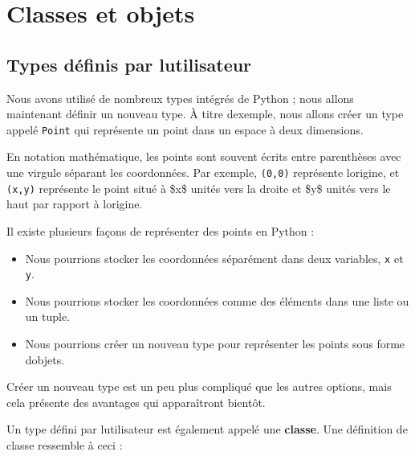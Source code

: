\hypertarget{classes-et-objets}{%
\section{Classes et objets}\label{classes-et-objets}}

\hypertarget{types-duxe9finis-par-lutilisateur}{%
\subsection{Types définis par
l\textquotesingle utilisateur}\label{types-duxe9finis-par-lutilisateur}}

Nous avons utilisé de nombreux types intégrés de Python ; nous allons
maintenant définir un nouveau type. À titre d\textquotesingle exemple,
nous allons créer un type appelé \texttt{Point} qui représente un point
dans un espace à deux dimensions.

En notation mathématique, les points sont souvent écrits entre
parenthèses avec une virgule séparant les coordonnées. Par exemple,
\texttt{(0,0)} représente l\textquotesingle origine, et \texttt{(x,y)}
représente le point situé à \$x\$ unités vers la droite et \$y\$ unités
vers le haut par rapport à l\textquotesingle origine.

Il existe plusieurs façons de représenter des points en Python :

\begin{itemize}
\tightlist
\item
  Nous pourrions stocker les coordonnées séparément dans deux variables,
  \texttt{x} et \texttt{y}.
\item
  Nous pourrions stocker les coordonnées comme des éléments dans une
  liste ou un tuple.
\item
  Nous pourrions créer un nouveau type pour représenter les points sous
  forme d\textquotesingle objets.
\end{itemize}

Créer un nouveau type est un peu plus compliqué que les autres options,
mais cela présente des avantages qui apparaîtront bientôt.

Un type défini par l\textquotesingle utilisateur est également appelé
une \textbf{classe}. Une définition de classe ressemble à ceci :

\begin{Shaded}
\begin{Highlighting}[]
\NormalTok{):}
\end{Highlighting}
\end{Shaded}

